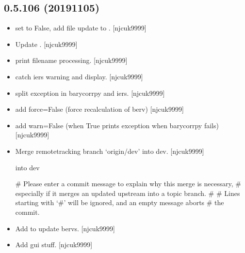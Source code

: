 \documentclass[a4paper,10pt,english]{report}
\begin{document}
\subsection{0.5.106 (2019\sphinxhyphen{}11\sphinxhyphen{}05)}
\label{\detokenize{misc/changelog:id55}}\begin{itemize}
\item {} 
 \sphinxhyphen{} set  to False, add file update to
. {[}njcuk9999{]}

\item {} 
Update . {[}njcuk9999{]}

\item {} 
 \sphinxhyphen{} print filename processing. {[}njcuk9999{]}

\item {} 
 \sphinxhyphen{} catch iers warning and display. {[}njcuk9999{]}

\item {} 
 \sphinxhyphen{} split exception in barycorrpy and iers.
{[}njcuk9999{]}

\item {} 
 \sphinxhyphen{} add force=False (force recalculation of
berv) {[}njcuk9999{]}

\item {} 
 \sphinxhyphen{} add warn=False (when True prints exception
when barycorrpy fails) {[}njcuk9999{]}

\item {} 
Merge remote\sphinxhyphen{}tracking branch ‘origin/dev’ into dev. {[}njcuk9999{]}

 into dev

\# Please enter a commit message to explain why this merge is necessary,
\# especially if it merges an updated upstream into a topic branch.
\#
\# Lines starting with ‘\#’ will be ignored, and an empty message aborts
\# the commit.

\item {} 
Add  \sphinxhyphen{} to update bervs. {[}njcuk9999{]}

\item {} 
Add gui stuff. {[}njcuk9999{]}

\end{itemize}
\end{document}
